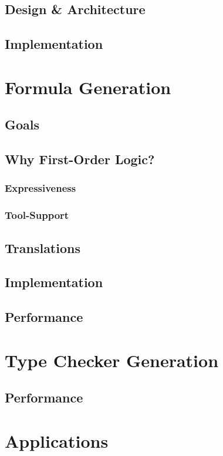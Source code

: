\documentclass[a4paper,twoside]{report}
\begin{document}
\section{Design \& Architecture}
\section{Implementation}

\chapter{Formula Generation}
\section{Goals}
\section{Why First-Order Logic?}
\subsection{Expressiveness}
\subsection{Tool-Support}
\section{Translations}
\section{Implementation}
\section{Performance}

\chapter{Type Checker Generation}
\section{Performance}

\chapter{Applications}
\end{document}
